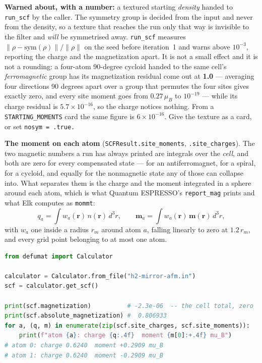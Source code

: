 \documentclass[11pt,a4paper]{article}
\newcommand{\qe}{Quantum ESPRESSO}
\newcommand{\code}[1]{\texttt{\small #1}}
\begin{document}
\begin{refuses}
\textbf{Warned about, with a number:} a textured starting \emph{density} handed
to \code{run\_scf} by the caller. The symmetry group is decided from the input
and never from the density, so a texture that reaches the run only that way is
invisible to the filter and \emph{will} be symmetrised away. \code{run\_scf}
measures $\lVert \rho - \mathrm{sym}(\rho)\rVert / \lVert \rho\rVert$ on the seed
before iteration~1 and warns above $10^{-3}$, reporting the charge and the
magnetization apart. It is not a small effect and it is not a rounding: a
four-atom 90-degree cycloid handed to the same cell's \emph{ferromagnetic} group
has its magnetization residual come out at \textbf{1.0} --- averaging four
directions 90 degrees apart over a group that permutes the four sites gives
exactly zero, and every site moment goes from $0.27\,\mu_B$ to $10^{-19}$ ---
while its charge residual is $5.7\times10^{-16}$, so the charge notices nothing.
From a \code{STARTING\_MOMENTS} card the same figure is $6\times10^{-16}$. Give
the texture as a card, or set \code{nosym = .true.}
\end{refuses}

\textbf{The moment on each atom} (\code{SCFResult.site\_moments},
\code{.site\_charges}). The two magnetic numbers a run has always printed are
integrals over the \emph{cell}, and both are zero for every compensated state
--- for an antiferromagnet, for a spiral, for a cycloid, and equally for the
nonmagnetic state any of those can collapse into. What separates them is the
charge and the moment integrated in a sphere around each atom, which is what
\qe{}'s \code{report\_mag} prints and what Elk computes as \code{mommt}:
%
\[
  q_a = \int w_a(\mathbf{r})\, n(\mathbf{r})\, d^3r,
  \qquad
  \mathbf{m}_a = \int w_a(\mathbf{r})\, \mathbf{m}(\mathbf{r})\, d^3r,
\]
%
with $w_a$ one inside a radius $r_m$ around atom $a$, falling linearly to zero
at $1.2\,r_m$, and every grid point belonging to at most one atom.

\begin{lstlisting}[language=Python]
from defumat import Calculator

calculator = Calculator.from_file("h2-mirror-afm.in")
scf = calculator.get_scf()

print(scf.magnetization)          # -2.3e-06  -- the cell total, zero
print(scf.absolute_magnetization) #  0.806933
for a, (q, m) in enumerate(zip(scf.site_charges, scf.site_moments)):
    print(f"atom {a}: charge {q:.4f}  moment {m[0]:+.4f} mu_B")
# atom 0: charge 0.6240  moment +0.2909 mu_B
# atom 1: charge 0.6240  moment -0.2909 mu_B
\end{lstlisting}
\end{document}
